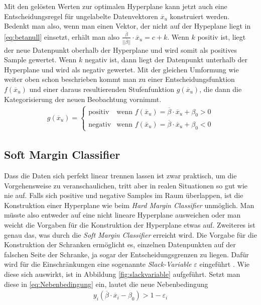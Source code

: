 \documentclass[
]{article}
\begin{document}
Mit den gelösten Werten zur optimalen Hyperplane kann jetzt auch eine
Entscheidungsregel für ungelabelte Datenvektoren \(\overline{x}_u\)
konstruiert werden. Bedenkt man also, wenn man einen Vektor, der nicht
auf der Hypeplane liegt in \eqref{eq:betanull} einsetzt, erhält man also
\(\frac{\overline \beta}{||\overline{\beta}||}\cdot \overline{x}_u=c+k\).
Wenn \(k\) positiv ist, liegt der neue Datenpunkt oberhalb der
Hyperplane und wird somit als positives Sample gewertet. Wenn \(k\)
negativ ist, dann liegt der Datenpunkt unterhalb der Hyperplane und wird
als negativ gewertet. Mit der gleichen Umformung wie weiter oben schon
beschrieben kommt man zu einer Entscheidungsfunktion
\(f(\overline{x}_u)\) und einer daraus resultierenden Stufenfunktion
\(g(\overline{x}_u)\), die dann die Kategorisierung der neuen
Beobachtung vornimmt. \begin{align}
g(\overline{x}_u)=\begin{cases}\mathrm{positiv}&\text{wenn } f(\overline{x}_u)=\overline{\beta}\cdot \overline{x}_u+\beta_0 > 0\\
\mathrm{negativ} & \text{wenn }f(\overline{x}_u)=\overline{\beta}\cdot \overline{x}_u+\beta_0<0
\end{cases}\label{eq:decisionf}
\end{align}

\subsection{Soft Margin Classifier}

Dass die Daten sich perfekt linear trennen lassen ist zwar praktisch, um
die Vorgehensweise zu veranschaulichen, tritt aber in realen Situationen
so gut wie nie auf. Falls sich positive und negative Samples im Raum
überlappen, ist die Konstruktion einer Hyperplane wie beim
\textit{Hard Margin Classifier} unmöglich. Man müsste also entweder auf
eine nicht lineare Hyperplane ausweichen oder man weicht die Vorgaben
für die Konstruktion der Hyperplane etwas auf. Zweiteres ist genau das,
was durch die \textit{Soft Margin Classifier} erreicht wird. Die Vorgabe
für die Konstruktion der Schranken ermöglicht es, einzelnen Datenpunkten
auf der falschen Seite der Schranke, ja sogar der Entscheidungsgrenzen
zu liegen. Dafür wird für die Einschränkungen eine sogenannte
\textit{Slack-Variable} \(\varepsilon\) eingeführt
\parencite{jamesIntroductionStatisticalLearning2021}. Wie diese sich
auswirkt, ist in Abbildung \ref{fig:slackvariable} aufgeführt. Setzt man
diese in \eqref{eq:Nebenbedingung} ein, lautet die neue Nebenbedingung
\begin{align}
y_i(\overline{\beta} \cdot \overline{x}_i-\beta_0)>1- \varepsilon_i \label{eq:nebbedsfm}
\end{align}
\end{document}

